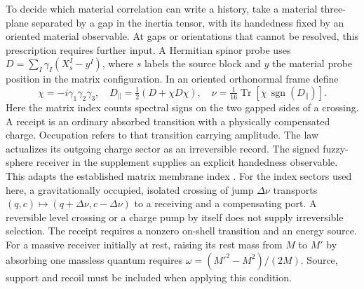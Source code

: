 \documentclass[11pt,a4paper]{article}
\newcommand{\Tr}{\operatorname{Tr}}
\newcommand{\sgn}{\operatorname{sgn}}
\begin{document}
To decide which material correlation can write a history, take a material three-plane separated by a gap in the inertia tensor, with its handedness fixed by an oriented material observable. At gaps or orientations that cannot be resolved, this prescription requires further input. A Hermitian spinor probe uses \(D=\sum_I\gamma_I(X_s^I-y^I)\), where \(s\) labels the source block and \(y\) the material probe position in the matrix configuration. In an oriented orthonormal frame define
\begin{equation}
 \chi=-i\gamma_1\gamma_2\gamma_3,\quad
 D_\parallel=\tfrac12(D+\chi D\chi),\quad
 \nu=\tfrac1{16}\Tr\!\left[\chi\,\sgn(D_\parallel)\right].
 \label{eq:index}
\end{equation}
Here the matrix index counts spectral signs on the two gapped sides of a crossing. A receipt is an ordinary absorbed transition with a physically compensated charge. Occupation refers to that transition carrying amplitude. The law actualizes its outgoing charge sector as an irreversible record. The signed fuzzy-sphere receiver in the supplement supplies an explicit handedness observable. This adapts the established matrix membrane index \cite{berenstein}. For the index sectors used here, a gravitationally occupied, isolated crossing of jump \(\Delta\nu\) transports \((q,c)\mapsto(q+\Delta\nu,c-\Delta\nu)\) to a receiving and a compensating port. A reversible level crossing or a charge pump by itself does not supply irreversible selection. The receipt requires a nonzero on-shell transition and an energy source. For a massive receiver initially at rest, raising its rest mass from \(M\) to \(M'\) by absorbing one massless quantum requires \(\omega=(M'^2-M^2)/(2M)\). Source, support and recoil must be included when applying this condition.
\end{document}
